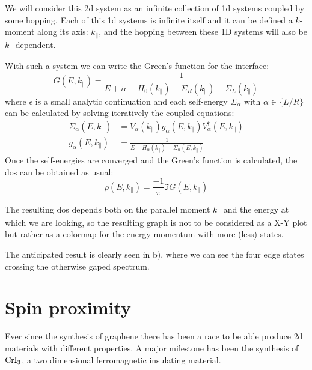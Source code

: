 We will consider this \ac{2d} system as an infinite collection of \ac{1d} systems coupled by some hopping. Each of this \ac{1d} systems is infinite itself and it can be defined a $k$-moment along its axis: $k_\parallel$, and the hopping between these \ac{1D} systems will also be $k_\parallel$-dependent.

With such a system we can write the Green's function for the interface:
\begin{equation}
  G(E,k_{\parallel}) = \frac{1}{E+i\epsilon-H_0(k_\parallel)-\Sigma_R(k_\parallel)-\Sigma_L(k_\parallel)}
\end{equation}
where $\epsilon$ is a small analytic continuation and each self-energy $\Sigma_\alpha$ with $\alpha\in\{L/R\}$ can be calculated by solving iteratively the coupled equations:
\begin{equation}
\begin{split}
  \Sigma_\alpha(E,k_\parallel) &= V_\alpha(k_\parallel)g_\alpha(E,k_\parallel)V^{\dagger}_\alpha(E,k_\parallel) \\
  g_\alpha(E,k_\parallel) &= \frac{1}{E-H_\alpha(k_\parallel)-\Sigma_\alpha(E,k_\parallel)}
\end{split}
\end{equation}
Once the self-energies are converged and the Green's function is calculated, the \ac{dos} can be obtained as usual:
\begin{equation}
   \rho(E,k_\parallel) = \frac{-1}{\pi}\Im{G(E,k_{\parallel})}
\end{equation}

The resulting \ac{dos} depends both on the parallel moment $k_\parallel$ and the energy at which we are looking, so the resulting graph is not to be considered as a X-Y plot but rather as a colormap for the energy-momentum with more (less) states.

The anticipated result is clearly seen in b), where we can see the four edge states crossing the otherwise gaped spectrum.





\section{Spin proximity}
Ever since the synthesis of graphene there has been a race to be able produce \ac{2d} materials with different properties. A major milestone has been the synthesis of $\ce{CrI_3}$, a two dimensional ferromagnetic insulating material\cite{Klein2018,Song2018,Wang2018}. %


